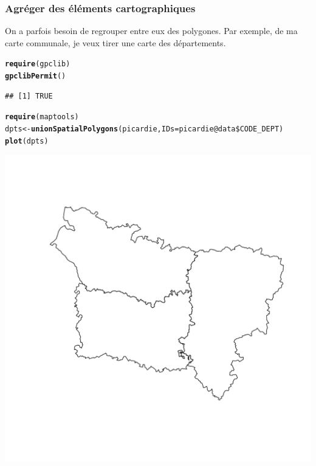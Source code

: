 \documentclass[slidetop, 10pt]{beamer}\usepackage{graphicx, color}
\makeatletter
\newcommand{\hlfunctioncall}[1]{\textcolor[rgb]{0.501960784313725,0,0.329411764705882}{\textbf{#1}}}%
\newenvironment{kframe}{%
 \def\at@end@of@kframe{}%
 \ifinner\ifhmode%
  \def\at@end@of@kframe{\end{minipage}}%
  \begin{minipage}{\columnwidth}%
 \fi\fi%
 \def\FrameCommand##1{\hskip\@totalleftmargin \hskip-\fboxsep
 \colorbox{shadecolor}{##1}\hskip-\fboxsep
     \hskip-\linewidth \hskip-\@totalleftmargin \hskip\columnwidth}%
 \MakeFramed {\advance\hsize-\width
   \@totalleftmargin\z@ \linewidth\hsize
   \@setminipage}}%
 {\par\unskip\endMakeFramed%
 \at@end@of@kframe}
\newenvironment{knitrout}{}{} %
\renewenvironment{knitrout}{\begin{tiny}}{\end{tiny}}
\makeatother
\begin{document}
\begin{frame}[fragile]
\frametitle{Agréger des éléments cartographiques}
On a parfois besoin de regrouper entre eux des polygones. Par exemple, de ma carte communale, je veux tirer une carte des départements. 

\begin{knitrout}\tiny
{}\color{fgcolor}\begin{kframe}
\begin{alltt}
\hlfunctioncall{require}(gpclib)
\hlfunctioncall{gpclibPermit}()
\end{alltt}
\begin{verbatim}
## [1] TRUE
\end{verbatim}
\begin{alltt}
\hlfunctioncall{require}(maptools)
dpts <- \hlfunctioncall{unionSpatialPolygons}(picardie, IDs = picardie@data\$CODE\_DEPT)
\hlfunctioncall{plot}(dpts)
\end{alltt}
\end{kframe}

{\centering \includegraphics[width=.6\linewidth]{images/union} 

}


\end{knitrout}

\end{frame}
\end{document}
